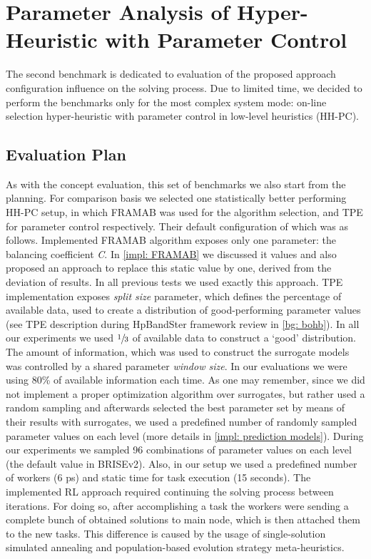 \section{Parameter Analysis of Hyper-Heuristic with Parameter Control}\label{eval:2}
The second benchmark is dedicated to evaluation of the proposed approach configuration influence on the solving process.
Due to limited time, we decided to perform the benchmarks only for the most complex system mode: on-line selection hyper-heuristic with parameter control in low-level heuristics (HH-PC).

\subsection{Evaluation Plan}\label{eval:2:plan}
As with the concept evaluation, this set of benchmarks we also start from the planning. For comparison basis we selected one statistically better performing HH-PC setup, in which FRAMAB was used for the algorithm selection, and TPE for parameter control respectively. Their default configuration of which was as follows. Implemented FRAMAB algorithm exposes only one parameter: the balancing coefficient \emph{C}. In \cref{impl: FRAMAB} we discussed it values and also proposed an approach to replace this static value by one, derived from the deviation of results. In all previous tests we used exactly this approach. TPE implementation exposes \emph{split size} parameter, which defines the percentage of available data, used to create a distribution of good-performing parameter values (see TPE description during HpBandSter framework review in \cref{bg: bohb}). In all our experiments we used $\sfrac{1}{3}$ of available data to construct a `good' distribution. The amount of information, which was used to construct the surrogate models was controlled by a shared parameter \emph{window size}. In our evaluations we were using 80\% of available information each time. As one may remember, since we did not implement a proper optimization algorithm over surrogates, but rather used a random sampling and afterwards selected the best parameter set by means of their results with surrogates, we used a predefined number of randomly sampled parameter values on each level (more details in \cref{impl: prediction models}). During our experiments we sampled 96 combinations of parameter values on each level (the default value in BRISEv2). Also, in our setup we used a predefined number of workers (6 ps) and static time for task execution (15 seconds). The implemented RL approach required continuing the solving process between iterations. For doing so, after accomplishing a task the workers were sending a complete bunch of obtained solutions to main node, which is then attached them to the new tasks. This difference is caused by the usage of single-solution simulated annealing and population-based evolution strategy meta-heuristics.


